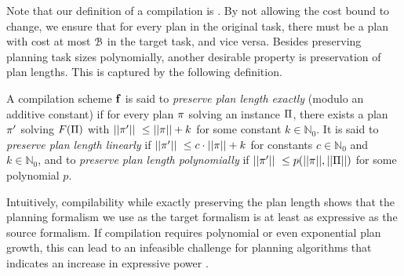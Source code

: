 Note that our definition of a compilation is . 
By not allowing the cost bound to change, we ensure that for every plan in the original task, there must be a plan with cost at most $\mathcal B$ in the target task, and vice versa.
Besides preserving planning task sizes polynomially, another desirable property is preservation of plan lengths. This is captured by the following definition.

\begin{definition}
  \label{def:compilation-preserving-plan-length}
  A compilation scheme ${\text{\textbf{f}}}$ is said to \emph{preserve plan length exactly} (modulo an additive constant) if for every plan $\pi{}$ solving an instance $\Pi$, there exists a plan $\pi'$ solving $F(\Pi)$ with $||\pi{}'||~ \leq ||\pi{}|| + k$ for some constant $k \in \mathbb{N}_0$. It is said to \emph{preserve plan length linearly} if $||\pi'||~ \leq c \cdot ||\pi|| + k$ for constants $c \in \mathbb{N}_0$ and $k \in \mathbb{N}_0$, and to \emph{preserve plan length polynomially} if $||\pi'||~ \leq p(||\pi||,||\Pi||)$ for some polynomial $p$.
\end{definition}

Intuitively, compilability while exactly preserving the plan length shows that the planning formalism we use as the target formalism is at least as expressive as the source formalism. If compilation requires polynomial or even exponential plan growth, this can lead to an infeasible challenge for planning algorithms that indicates an increase in expressive power \autocite{nebel-jair2000,thiebaux-et-al-aij2005}.

